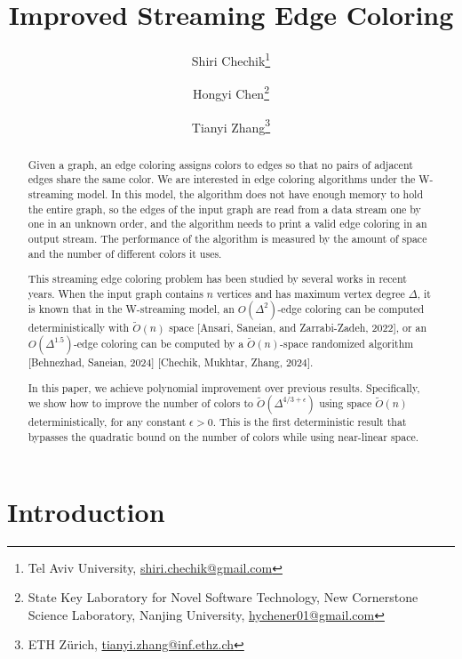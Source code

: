 \documentclass[11pt,a4paper]{article}
\begin{document}
\title{Improved Streaming Edge Coloring}
\author{
	Shiri Chechik\thanks{Tel Aviv University, \href{}{shiri.chechik@gmail.com}} \and 
	Hongyi Chen\thanks{State Key Laboratory for Novel Software Technology, New Cornerstone Science Laboratory, Nanjing University, \href{}{hychener01@gmail.com}}\and 
	Tianyi Zhang\thanks{ETH Zürich, \href{}{tianyi.zhang@inf.ethz.ch}}
}
\date{}

\maketitle

\begin{abstract}
	Given a graph, an edge coloring assigns colors to edges so that no pairs of adjacent edges share the same color. We are interested in edge coloring algorithms under the W-streaming model. In this model, the algorithm does not have enough memory to hold the entire graph, so the edges of the input graph are read from a data stream one by one in an unknown order, and the algorithm needs to print a valid edge coloring in an output stream. The performance of the algorithm is measured by the amount of space and the number of different colors it uses.
	
	This streaming edge coloring problem has been studied by several works in recent years. When the input graph contains $n$ vertices and has maximum vertex degree $\Delta$, it is known that in the W-streaming model, an $O(\Delta^2)$-edge coloring can be computed deterministically with $\tilde{O}(n)$ space [Ansari, Saneian, and Zarrabi-Zadeh, 2022], or an $O(\Delta^{1.5})$-edge coloring can be computed by a $\tilde{O}(n)$-space randomized algorithm [Behnezhad, Saneian, 2024] [Chechik, Mukhtar, Zhang, 2024].
	
	In this paper, we achieve polynomial improvement over previous results. Specifically, we show how to improve the number of colors to $\tilde{O}(\Delta^{4/3+\epsilon})$ using space $\tilde{O}(n)$ deterministically, for any constant $\epsilon > 0$.
    This is the first deterministic result that bypasses the quadratic bound on the number of colors while using near-linear space.

\end{abstract}

\thispagestyle{empty}
\clearpage
\setcounter{page}{1}	

\section{Introduction}
\end{document}

